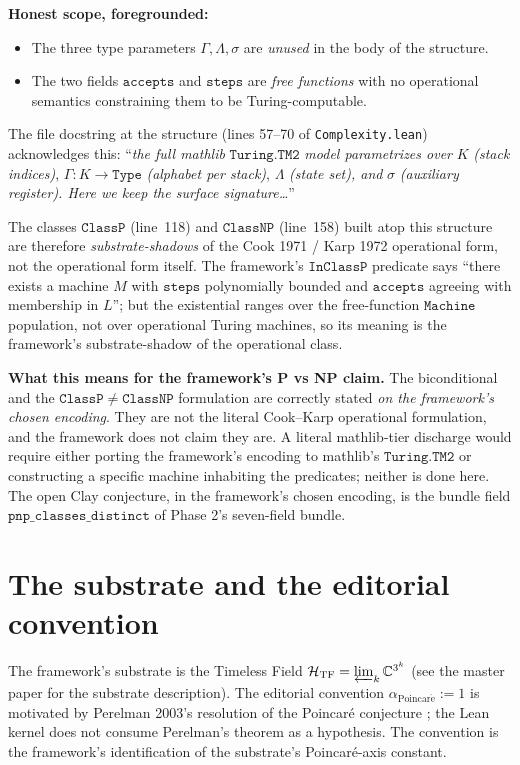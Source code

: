 \documentclass[11pt,a4paper]{article}
\theoremstyle{plain}
\theoremstyle{definition}
\begin{document}
\noindent
\textbf{Honest scope, foregrounded:}
\begin{itemize}[leftmargin=*,nosep]
\item The three type parameters $\Gamma, \Lambda, \sigma$ are
  \emph{unused} in the body of the structure.
\item The two fields $\mathtt{accepts}$ and $\mathtt{steps}$ are
  \emph{free functions} with no operational semantics constraining
  them to be Turing-computable.
\end{itemize}
The file docstring at the structure (lines 57--70 of
\texttt{Complexity.lean}) acknowledges this: ``\emph{the full mathlib}
$\mathtt{Turing.TM2}$ \emph{model parametrizes over} $K$ \emph{(stack
indices)}, $\Gamma : K \to \mathtt{Type}$ \emph{(alphabet per stack)},
$\Lambda$ \emph{(state set), and} $\sigma$ \emph{(auxiliary register).
Here we keep the surface signature\ldots}''

The classes $\mathtt{ClassP}$ (line~118) and $\mathtt{ClassNP}$
(line~158) built atop this structure are therefore
\emph{substrate-shadows} of the Cook 1971 / Karp 1972
operational form, not the operational form itself. The framework's
$\mathtt{InClassP}$ predicate says ``there exists a machine $M$ with
$\mathtt{steps}$ polynomially bounded and $\mathtt{accepts}$ agreeing
with membership in $L$''; but the existential ranges over the
free-function $\mathtt{Machine}$ population, not over operational
Turing machines, so its meaning is the framework's substrate-shadow
of the operational class.

\textbf{What this means for the framework's P vs NP claim.} The
biconditional and the $\mathtt{ClassP} \neq \mathtt{ClassNP}$
formulation are correctly stated \emph{on the framework's chosen
encoding}. They are not the literal Cook--Karp operational
formulation, and the framework does not claim they are. A literal
mathlib-tier discharge would require either porting the framework's
encoding to mathlib's $\mathtt{Turing.TM2}$ or constructing a
specific machine inhabiting the predicates; neither is done here. The
open Clay conjecture, in the framework's chosen encoding, is the
bundle field $\mathtt{pnp\_classes\_distinct}$ of Phase 2's
seven-field bundle.

\section{The substrate and the editorial convention}
\label{sec:substrate}

The framework's substrate is the Timeless Field
$\mathcal{H}_{\mathrm{TF}} = \varprojlim_{k} \mathbb{C}^{3^{k}}$
(see the master paper \cite{master_substrate} for the substrate
description). The editorial convention
$\alpha_{\mathrm{Poincar\acute e}} := 1$ is motivated by Perelman
2003's resolution of the Poincar\'e conjecture \cite{perelman2002,%
perelman2003a,perelman2003b}; the Lean kernel does not consume
Perelman's theorem as a hypothesis. The convention is the framework's
identification of the substrate's Poincar\'e-axis constant.
\end{document}
